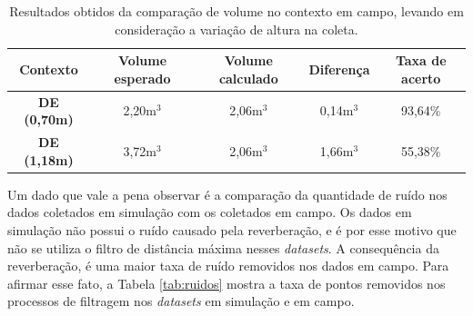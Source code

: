 \begin{table}[H]
    \centering
    \caption{Resultados obtidos da comparação de volume no contexto em campo, levando em consideração a variação de altura na coleta.}
    \begin{tabular}{@{}ccccc@{}}
        \toprule
        \textbf{Contexto} & \textbf{Volume esperado} & \textbf{Volume calculado} & \textbf{Diferença} & \textbf{Taxa de acerto} \\ \midrule
        \textbf{DE (0,70m)} & 2,20m$^3$ & 2,06m$^3$ & 0,14m$^3$ & 93,64\% \\
        \textbf{DE (1,18m)} & 3,72m$^3$ & 2,06m$^3$ & 1,66m$^3$ & 55,38\% \\ \bottomrule
    \end{tabular}
    \label{tab:result_inloco_vol}
\end{table}

Um dado que vale a pena observar é a comparação da quantidade de ruído nos dados coletados em simulação com os coletados em campo.
Os dados em simulação não possui o ruído causado pela reverberação, e é por esse motivo que não se utiliza o filtro de distância máxima nesses \textit{datasets}.
A consequência da reverberação, é uma maior taxa de ruído removidos nos dados em campo.
Para afirmar esse fato, a Tabela \ref{tab:ruidos} mostra a taxa de pontos removidos nos processos de filtragem nos \textit{datasets} em simulação e em campo.

